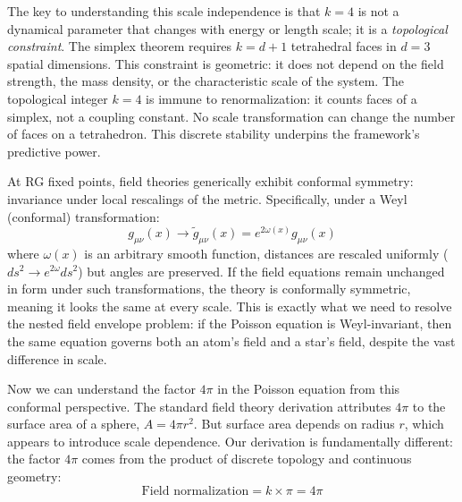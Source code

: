 \documentclass[aps,prd,preprint,superscriptaddress,showpacs,preprintnumbers,amsmath,amssymb,nofootinbib]{revtex4-2}
\begin{document}

The key to understanding this scale independence is that $k=4$ is not a dynamical parameter that changes with energy or length scale; it is a \emph{topological constraint}. The simplex theorem requires $k = d+1$ tetrahedral faces in $d=3$ spatial dimensions. This constraint is geometric: it does not depend on the field strength, the mass density, or the characteristic scale of the system. The topological integer $k=4$ is immune to renormalization: it counts faces of a simplex, not a coupling constant. No scale transformation can change the number of faces on a tetrahedron. This discrete stability underpins the framework's predictive power.

At RG fixed points, field theories generically exhibit conformal symmetry: invariance under local rescalings of the metric. Specifically, under a Weyl (conformal) transformation:
\begin{equation}
g_{\mu\nu}(x) \to \tilde{g}_{\mu\nu}(x) = e^{2\omega(x)} g_{\mu\nu}(x)
\label{eq:weyl-transformation}
\end{equation}
where $\omega(x)$ is an arbitrary smooth function, distances are rescaled uniformly ($ds^2 \to e^{2\omega} ds^2$) but angles are preserved. If the field equations remain unchanged in form under such transformations, the theory is conformally symmetric, meaning it looks the same at every scale. This is exactly what we need to resolve the nested field envelope problem: if the Poisson equation is Weyl-invariant, then the same equation governs both an atom's field and a star's field, despite the vast difference in scale.

Now we can understand the factor $4\pi$ in the Poisson equation from this conformal perspective. The standard field theory derivation attributes $4\pi$ to the surface area of a sphere, $A = 4\pi r^2$. But surface area depends on radius $r$, which appears to introduce scale dependence. Our derivation is fundamentally different: the factor $4\pi$ comes from the product of discrete topology and continuous geometry:
\begin{equation}
\text{Field normalization} = k \times \pi = 4\pi
\label{eq:field-normalization}
\end{equation}
\end{document}
